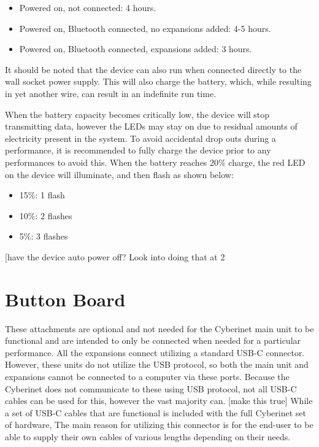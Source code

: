 \begin{itemize}
    \item Powered on, not connected: 4 hours.
    \item Powered on, Bluetooth connected, no expansions added: 4-5 hours.
    \item Powered on, Bluetooth connected, expansions added: 3 hours.
\end{itemize}


It should be noted that the device can also run when connected directly to the wall socket power supply. This will also charge the battery, which, while resulting in yet another wire, can result in an indefinite run time.

When the battery capacity becomes critically low, the device will stop transmitting data, however the LEDs may stay on due to residual amounts of electricity present in the system. To avoid accidental drop outs during a performance, it is recommended to fully charge the device prior to any performances to avoid this. When the battery reaches 20\% charge, the red LED on the device will illuminate, and then flash as shown below:

\begin{itemize}
    \item 15\%: 1 flash
    \item 10\%: 2 flashes
    \item 5\%: 3 flashes
\end{itemize}

[have the device auto power off? Look into doing that at 2%


\section{Button Board}

These attachments are optional and not needed for the Cyberinet main unit to be functional and are intended to only be connected when needed for a particular performance. All the expansions connect utilizing a standard USB-C connector. However, these units do not utilize the USB protocol, so both the main unit and expansions cannot be connected to a computer via these ports. Because the Cyberinet does not communicate to these using USB protocol, not all USB-C cables can be used for this, however the vast majority can. [make this true] While a set of USB-C cables that are functional is included with the full Cyberinet set of hardware, The main reason for utilizing this connector is for the end-user to be able to supply their own cables of various lengths depending on their needs. 

